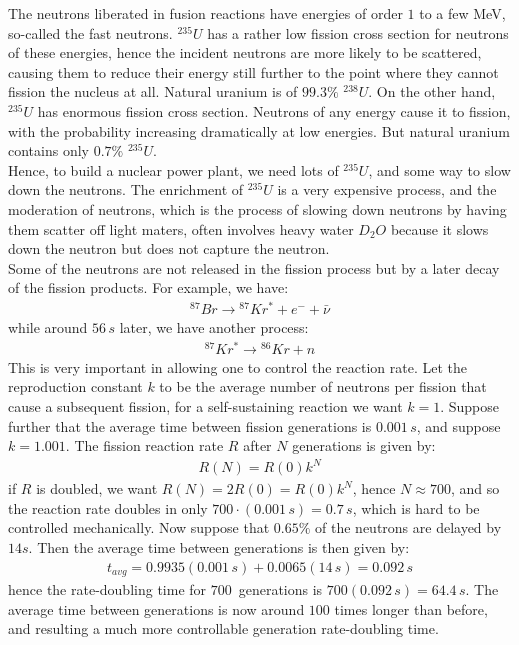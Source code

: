 \documentclass[11pt]{article}
\theoremstyle{break}
\theoremstyle{break}
\begin{document}
The neutrons liberated in fusion reactions have energies of order $1$ to a few MeV, so-called the fast neutrons. $^{235}U$ has a rather low fission cross section for neutrons of these energies, hence the incident neutrons are more likely to be scattered, causing them to reduce their energy still further to the point where they cannot fission the nucleus at all. Natural uranium is of $99.3\%$ $^{238}U$. On the other hand, $^{235}U$ has enormous fission cross section. Neutrons of any
energy cause it to fission, with the probability increasing dramatically at low energies. But natural uranium contains only $0.7\%$ $^{235}U$.\\

Hence, to build a nuclear power plant, we need lots of $^{235}U$, and some way to slow down the neutrons. The enrichment of $^{235}U$ is a very expensive process, and the moderation of neutrons, which is the process of slowing down neutrons by having them scatter off light maters, often involves heavy water $D_2O$ because it slows down the neutron but does not capture the neutron. \\

Some of the neutrons are not released in the fission process but by a later decay of the fission products. For example, we have:
\begin{align*}
^{87}Br \to {}^{87}Kr^* + e^- + \bar{\nu}
\end{align*}
while around $56\, s$ later, we have another process:
\begin{align*}
^{87}Kr^* \to {}^{86}Kr + n
\end{align*}
This is very important in allowing
one to control the reaction rate. Let the reproduction constant $k$ to be the average number of neutrons per fission that cause a subsequent fission, for a self-sustaining reaction we want $k=1$. Suppose further that the average time between fission generations is $0.001 \, s$, and suppose $k = 1.001$. The fission reaction rate $R$ after $N$ generations is given by:
\begin{align*}
R(N) = R(0)k^N 
\end{align*}
if $R$ is doubled, we want $R(N) = 2R(0) = R(0)k^N$, hence $N \approx 700$, and so the reaction rate doubles  in only $700 \cdot (0.001\, s) = 0.7\, s$, which is hard to be controlled mechanically. Now suppose that $0.65\%$ of the neutrons are delayed by $14 s$. Then the average time between generations is then given by:
\begin{align*}
t_{avg} = 0.9935(0.001\,s) + 0.0065(14\, s) = 0.092\, s
\end{align*} 
hence the rate-doubling time for $700$\, generations is $700(0.092\, s) = 64.4\, s$. The average time between generations is now around $100$ times longer than before, and resulting a much more controllable generation rate-doubling time.\\
\end{document}
